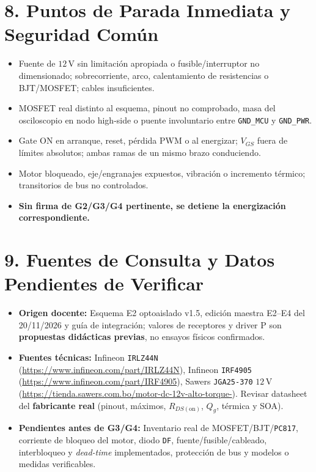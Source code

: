 \documentclass[10pt, a4paper, landscape]{article}
\begin{document}
\vspace{0.08cm}
\noindent
\begin{minipage}[t]{0.49\linewidth}
\section*{8. Puntos de Parada Inmediata y Seguridad Común}
{\footnotesize
\begin{itemize}[noitemsep, topsep=2pt]
    \item Fuente de $12\,\text{V}$ sin limitación apropiada o fusible/interruptor no dimensionado; sobrecorriente, arco, calentamiento de resistencias o BJT/MOSFET; cables insuficientes.
    \item MOSFET real distinto al esquema, pinout no comprobado, masa del osciloscopio en nodo high-side o puente involuntario entre \texttt{GND\_MCU} y \texttt{GND\_PWR}.
    \item Gate ON en arranque, reset, pérdida PWM o al energizar; $V_{GS}$ fuera de límites absolutos; ambas ramas de un mismo brazo conduciendo.
    \item Motor bloqueado, eje/engranajes expuestos, vibración o incremento térmico; transitorios de bus no controlados.
    \item \textbf{\textcolor{warnred}{Sin firma de G2/G3/G4 pertinente, se detiene la energización correspondiente.}}
\end{itemize}
}
\end{minipage}\hfill
\begin{minipage}[t]{0.49\linewidth}
\section*{9. Fuentes de Consulta y Datos Pendientes de Verificar}
{\footnotesize
\begin{itemize}[noitemsep, topsep=2pt]
    \item \textbf{Origen docente:} Esquema E2 optoaislado v1.5, edición maestra E2--E4 del 20/11/2026 y guía de integración; valores de receptores y driver P son \textbf{propuestas didácticas previas}, no ensayos físicos confirmados.
    \item \textbf{Fuentes técnicas:} Infineon \texttt{IRLZ44N} (\url{https://www.infineon.com/part/IRLZ44N}), Infineon \texttt{IRF4905} (\url{https://www.infineon.com/part/IRF4905}), Sawers \texttt{JGA25-370} $12\,\text{V}$ (\url{https://tienda.sawers.com.bo/motor-dc-12v-alto-torque-}). Revisar datasheet del \textbf{fabricante real} (pinout, máximos, $R_{DS(\text{on})}$, $Q_g$, térmica y SOA).
    \item \textbf{Pendientes antes de G3/G4:} Inventario real de MOSFET/BJT/\texttt{PC817}, corriente de bloqueo del motor, diodo \texttt{DF}, fuente/fusible/cableado, interbloqueo y \textit{dead-time} implementados, protección de bus y modelos o medidas verificables.
\end{itemize}
}
\end{minipage}
\end{document}
